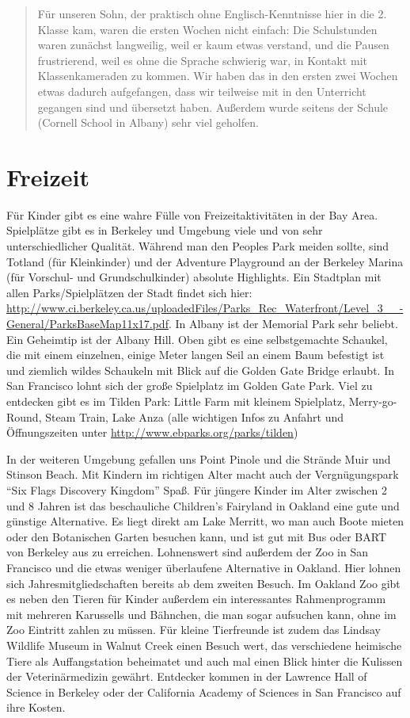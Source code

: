 \documentclass[a4paper]{scrreprt}
\begin{document}
\begin{quote}
Für unseren Sohn, der praktisch ohne Englisch-Kenntnisse hier in die 2. Klasse kam, waren die ersten Wochen nicht einfach: Die Schulstunden waren zunächst langweilig, weil er kaum etwas verstand, und die Pausen frustrierend, weil es ohne die Sprache schwierig war, in Kontakt mit Klassenkameraden zu kommen. Wir haben das in den ersten zwei Wochen etwas dadurch aufgefangen, dass wir teilweise mit in den Unterricht gegangen sind und übersetzt haben. Außerdem wurde seitens der Schule (Cornell School in Albany) sehr viel geholfen.
\end{quote}

\section{Freizeit}

Für Kinder gibt es eine wahre Fülle von Freizeitaktivitäten in der Bay Area. Spielplätze gibt es in Berkeley und Umgebung viele und von sehr unterschiedlicher Qualität. Während man den Peoples Park meiden sollte, sind Totland (für Kleinkinder) und der Adventure Playground an der Berkeley Marina (für Vorschul- und Grundschulkinder) absolute Highlights. 
Ein Stadtplan mit allen Parks/Spielplätzen der Stadt findet sich hier: \url{http://www.ci.berkeley.ca.us/uploadedFiles/Parks\_Rec\_Waterfront/Level\_3\_\_-General/ParksBaseMap11x17.pdf}.
In Albany ist der Memorial Park sehr beliebt. Ein Geheimtip ist der Albany Hill. Oben gibt es eine selbstgemachte Schaukel, die mit einem einzelnen, einige Meter langen Seil an einem Baum befestigt ist und ziemlich wildes Schaukeln mit Blick auf die Golden Gate Bridge erlaubt. In San Francisco lohnt sich der große Spielplatz im Golden Gate Park. Viel zu entdecken gibt es im Tilden Park:
Little Farm mit kleinem Spielplatz, Merry-go-Round, Steam Train, Lake Anza (alle wichtigen Infos zu Anfahrt und Öffnungszeiten unter \url{http://www.ebparks.org/parks/tilden})

In der weiteren Umgebung gefallen uns Point Pinole und die Strände Muir und Stinson Beach. Mit Kindern im richtigen Alter macht auch der Vergnügungspark "`Six Flags Discovery Kingdom"' Spaß.
Für jüngere Kinder im Alter zwischen 2 und 8 Jahren ist das beschauliche Children's Fairyland in Oakland eine gute und günstige Alternative.
Es liegt direkt am Lake Merritt, wo man auch Boote mieten oder den Botanischen Garten besuchen kann, 
und ist gut mit Bus oder BART von Berkeley aus zu erreichen.
Lohnenswert sind außerdem der Zoo in San Francisco und die etwas weniger überlaufene Alternative in Oakland.
Hier lohnen sich Jahresmitgliedschaften bereits ab dem zweiten Besuch.
Im Oakland Zoo gibt es neben den Tieren für Kinder außerdem ein interessantes Rahmenprogramm mit mehreren Karussells und Bähnchen, die man sogar aufsuchen kann, ohne im Zoo Eintritt zahlen zu müssen.
Für kleine Tierfreunde ist zudem das Lindsay Wildlife Museum in Walnut Creek einen Besuch wert, 
das verschiedene heimische Tiere als Auffangstation beheimatet und 
auch mal einen Blick hinter die Kulissen der Veterinärmedizin gewährt. 
Entdecker kommen in der Lawrence Hall of Science in Berkeley oder 
der California Academy of Sciences in San Francisco auf ihre Kosten.
\end{document}
